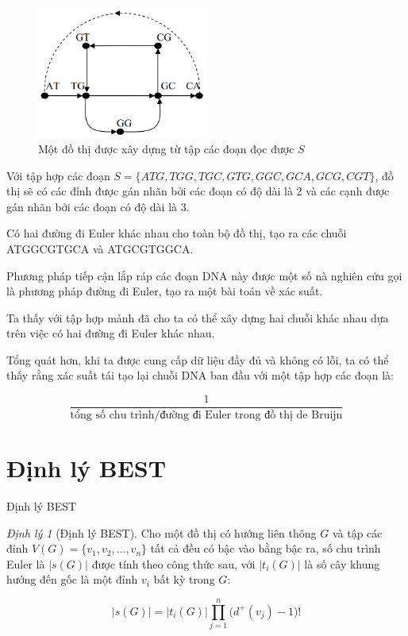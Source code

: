 \documentclass[10pt]{beamer}
\theoremstyle{remark}
\newtheorem{dl}{Định lý}
\numberwithin{algocf}{section}
\numberwithin{equation}{section}
\numberwithin{dl}{section}
\numberwithin{figure}{section}
\begin{document}
\begin{frame}
    \begin{figure}[h!]
        \centering
        \includegraphics[width=0.5\textwidth]{3.png}
        \caption{Một đồ thị được xây dựng từ tập các đoạn đọc được $S$}
        \label{fig:3}
    \end{figure}

    Với tập hợp các đoạn $S = \lbrace ATG, TGG, TGC, GTG, GGC, GCA, GCG, CGT \rbrace$,
    đồ thị sẽ có các đỉnh được gán nhãn bởi các đoạn có độ dài là 2 và các cạnh được gán nhãn bởi các đoạn có độ dài là 3.

\end{frame}

\begin{frame}
    Có hai đường đi Euler khác nhau cho toàn bộ đồ thị, tạo ra các chuỗi ATGGCGTGCA và ATGCGTGGCA.

    Phương pháp tiếp cận lắp ráp các đoạn DNA này được một số nà nghiên cứu gọi là phương pháp đường đi Euler, tạo ra một bài toán về xác suất.

    Ta thấy với tập hợp mảnh đã cho ta có thể xây dựng hai chuỗi khác nhau dựa trên việc có hai đường đi Euler khác nhau.

    Tổng quát hơn, khi ta được cung cấp dữ liệu đầy đủ và không có lỗi, ta có thể thấy rằng xác suất tái tạo lại chuỗi DNA ban đầu với một tập hợp các đoạn là:

    \begin{equation}
        \dfrac{1}{\text{tổng số chu trình/đường đi Euler trong đồ thị de Bruijn}}
    \end{equation}
\end{frame}

\section{Định lý BEST}

\begin{frame}{Định lý BEST}
    \begin{dl}[Định lý BEST]
        Cho một đồ thị có hướng liên thông $G$ và tập các đỉnh $V(G)=\lbrace v_1, v_2, \dots, v_n \rbrace$ tất cả đều có bậc vào bằng bậc ra, số chu trình Euler là $\lvert s(G) \rvert$ được tính theo công thức sau, với $\lvert t_i (G) \rvert$ là số cây khung hướng đến gốc là một đỉnh $v_i$ bất kỳ trong $G$:

        \begin{equation*}
            \lvert s(G) \rvert = \lvert t_i (G) \rvert \prod_{j=1}^n \big( d^+ (v_j) - 1 \big)!
        \end{equation*}
    \end{dl}
\end{frame}
\end{document}
